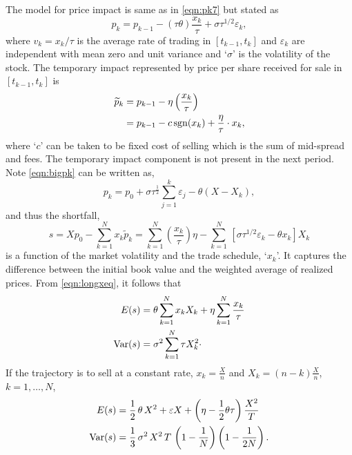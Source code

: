 The model for price impact is same as in \eqref{eqn:pk7} but stated as
	\begin{equation} \label{eqn:bigpk}
	p_k= p_{k-1} - (\tau\theta)\dfrac{x_k}{\tau} + \sigma \tau^{1/2}\varepsilon_k,
	\end{equation}
where $v_k = x_k / \tau$ is the average rate of trading in $[t_{k-1}, t_k]$ and $\varepsilon_k$ are independent with mean zero and unit variance and `$\sigma$' is the volatility of the stock. The temporary impact represented by price per share received for sale in $[t_{k-1}, t_k]$ is
	\begin{equation} \label{eqn:pdouble}
	\begin{split}
	\widetilde{p}_k &= p_{k-1} - \eta\left( \dfrac{x_k}{\tau} \right) \\
			&= p_{k-1} - c \sgn(x_k) + \frac{\eta}{\tau} \cdot x_k,
	\end{split}
	\end{equation}
where `$c$' can be taken to be fixed cost of selling which is the sum of mid-spread and fees. The temporary impact component is not present in the next period. Note \eqref{eqn:bigpk} can be written as,
	\begin{equation} \label{eqn:morepk}
	p_k = p_0 + \sigma\tau^{\frac{1}{2}}\sum_{j=1}^k\varepsilon_j - \theta(X - X_k),
	\end{equation}
and thus the shortfall,
	\begin{equation} \label{eqn:longxeq}
	s = Xp_0 - \sum_{k=1}^N x_k\widetilde{p}_k = \sum_{k=1}^N \left(\frac{x_k}{\tau}\right) \eta - \sum_{k=1}^N \,[\sigma\tau^{1/2}\varepsilon_k - \theta x_k]X_k
	\end{equation}
is a function of the market volatility and the trade schedule, `$x_k$'. It captures the difference between the initial book value and the weighted average of realized prices. From \eqref{eqn:longxeq}, it follows that
	\begin{equation} \label{eqn:evardouble}
	\begin{split}
	E(s) &=  \theta\sum_{k=1}^N x_k X_k + \eta \sum_{k=1}^N \frac{x_k}{\tau} \\
	\var(s) &= \sigma^2 \sum_{k=1}^N \tau X_{k}^2\cdot
	\end{split}
	\end{equation}
If the trajectory is to sell at a constant rate, $x_k = \frac{X}{n}$ and $X_k = (n - k) \frac{X}{n}$, $k = 1, \ldots, N$,
	\begin{equation} \label{eqn:secondevardouble}
	\begin{split}
	E(s)&= \frac{1}{2}\, \theta\, X^2 + \varepsilon X + \left(\eta - \frac{1}{2} \theta \tau \right) \frac{X^2}{T} \\
	\var(s)&= \frac{1}{3}\, \sigma^2\, X^2\, T\, \left(1 - \frac{1}{N}\right)\left( 1 - \frac{1}{2N} \right).
	\end{split}
	\end{equation}
